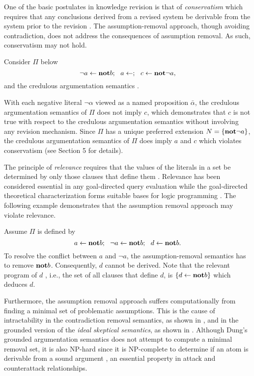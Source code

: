 One of the basic postulates in knowledge revision is that of 
{\em conservatism} which requires that any conclusions derived from a
revised system be derivable from the system prior to the revision
\cite{gardenfors92}. 
%
The assumption-removal approach, though avoiding contradiction, does not
address the consequences of assumption removal. As such, conservatism may not hold. 
\begin{example}\label{example conservatism}
Consider $\Pi$ below
\[
\neg a \leftarrow {\tt \bf not} b ; \ \
a \leftarrow ; \ \
c \leftarrow {\tt \bf not} \neg a,
\]
and the credulous argumentation semantics {\rm \cite{dung93a}}.

With each negative literal $\neg \alpha$ viewed as a named proposition
$\bar{\alpha}$, the credulous argumentation semantics of $\Pi$ 
does not imply $c$, which demonstrates that $c$ is not true with
respect to the credulous argumentation semantics without involving any
revision mechanism. Since $\Pi$ has a unique preferred extension
$N = \{{\tt \bf not} \neg a\}$,  the credulous argumentation semantics 
of $\Pi$ does imply $a$ and $c$ which violates conservatism (see Section 5 for
details). 
\end{example}
The principle of {\em relevance} requires that the values of the literals 
in a set be determined by only those clauses that define them
\cite{dix92,huyuan91}. Relevance  has been considered essential in 
any goal-directed query evaluation \cite{ap93} while 
the goal-directed theoretical characterization forms suitable bases for
logic programming \cite{mnps91}.
The following example demonstrates that the assumption removal approach
may violate relevance.
\begin{example} Assume $\Pi$ is defined by
\[
a \leftarrow {\tt \bf not} b ; \ \
\neg a \leftarrow {\tt \bf not} b ; \ \
d \leftarrow {\tt \bf not} b.
\]
To resolve the conflict between $a$ and $\neg a$, the
assumption-removal semantics 
has to remove ${\tt \bf not} b$. Consequently, $d$ cannot be derived.
Note that the relevant program of $d$
, i.e., the set of all clauses that define $d$, 
is $\{d \leftarrow {\tt \bf not} b\}$ which deduces $d$.
\end{example}
Furthermore, the assumption removal approach suffers computationally from
finding a minimal set of problematic assumptions. This is the cause of 
intractability in the contradiction removal semantics, as shown 
in \cite{wit93a}, and in the grounded version of 
the {\em ideal skeptical semantics}, as shown in \cite{youcart94}.
Although Dung's grounded argumentation semantics \cite{dung93a}
does not attempt to compute
a minimal removal set, it is also NP-hard since 
it is NP-complete to determine if an atom is derivable from a sound 
argument \cite{youcart94}, an essential property in attack and 
counterattack relationships.

